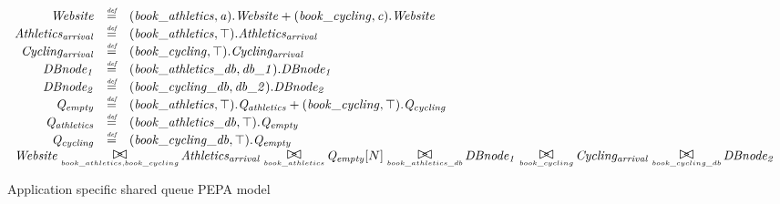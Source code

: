 \begin{figure}
\end{figure}

\begin{figure}
	\caption{Application specific shared queue PEPA model}
	\centering
	\begin{displaymath}
	\begin{array}{rcl}
	\mathit{Website} & \rmdef & (\mathit{book\_athletics},\mathit{a}).\mathit{Website}+(\mathit{book\_cycling},\mathit{c}).\mathit{Website}\\
	\mathit{Athletics_{arrival}} & \rmdef & (\mathit{book\_athletics},\top).\mathit{Athletics_{arrival}}\\
	\mathit{Cycling_{arrival}} & \rmdef & (\mathit{book\_cycling},\top).\mathit{Cycling_{arrival}}\\
	\mathit{DBnode_1} & \rmdef & (\mathit{book\_athletics\_db},\mathit{db\_1}).\mathit{DBnode_1}\\
	\mathit{DBnode_2} & \rmdef & (\mathit{book\_cycling\_db},\mathit{db\_2}).\mathit{DBnode_2}\\
	\mathit{Q_{empty}} & \rmdef & (\mathit{book\_athletics},\top).\mathit{Q_{athletics}}+(\mathit{book\_cycling},\top).\mathit{Q_{cycling}}\\
	\mathit{Q_{athletics}} & \rmdef & (\mathit{book\_athletics\_db},\top).\mathit{Q_{empty}}\\
	\mathit{Q_{cycling}} & \rmdef & (\mathit{book\_cycling\_db},\top).\mathit{Q_{empty}}\\
	[0.0ex]		\multicolumn{3}{l}{\mathit{Website}\sync{book\_athletics,book\_cycling}\mathit{Athletics_{arrival}}\sync{book\_athletics}\mathit{Q_{empty}}[N]\sync{book\_athletics\_db}\mathit{DBnode_1}\sync{book\_cycling}\mathit{Cycling_{arrival}}\sync{book\_cycling\_db}\mathit{DBnode_2}}\\
	[0.0ex]	\end{array}
	\end{displaymath}
\end{figure}

